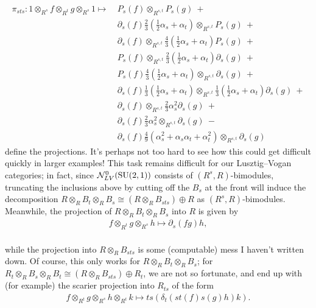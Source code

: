 \begin{align*}
\pi_{sts} : 1 \otimes_{R^s} f \otimes_{R^t} g \otimes_{R^s} 1 \mapsto\ &P_s(f) \otimes_{R^{s,t}} P_s(g)\ +\\
&\partial_s(f)\frac{2}{3}\left(\frac{1}{2}\alpha_s + \alpha_t\right) \otimes_{R^{s,t}} P_s(g)\ +\\
&\partial_s(f) \otimes_{R^{s,t}} \frac{4}{3}\left(\frac{1}{2}\alpha_s + \alpha_t\right) P_s(g)\ +\\
&P_s(f) \otimes_{R^{s,t}} \frac{2}{3}\left(\frac{1}{2}\alpha_s + \alpha_t\right)\partial_s(g)\ +\\
&P_s(f) \frac{4}{3}\left(\frac{1}{2}\alpha_s + \alpha_t\right) \otimes_{R^{s,t}} \partial_s(g)\ +\\
&\partial_s(f)\frac{1}{3}\left(\frac{1}{2}\alpha_s + \alpha_t\right) \otimes_{R^{s,t}} \frac{1}{3}\left(\frac{1}{2}\alpha_s + \alpha_t\right)\partial_s(g)\ +\\
&\partial_s(f) \otimes_{R^{s,t}} \frac{2}{3}\alpha_s^2\partial_s(g)\ +\\
&\partial_s(f)\frac{2}{3}\alpha_s^2 \otimes_{R^{s,t}} \partial_s(g)\ -\\
&\partial_s(f)\frac{4}{9}(\alpha_s^2 + \alpha_s\alpha_t + \alpha_t^2) \otimes_{R^{s,t}} \partial_s(g)
\end{align*}
\noindent define the projections. It's perhaps not too hard to see how this could get difficult quickly in larger examples! This task remains difficult for our Lusztig--Vogan categories; in fact, since $\mathcal{N}_{LV}^0(\textup{SU}(2, 1))$ consists of $(R^s, R)$-bimodules, truncating the inclusions above by cutting off the $B_s$ at the front will induce the decomposition $R \otimes_R B_t \otimes_R B_s \cong (R \otimes_R B_{sts}) \oplus R$ as $(R^s, R)$-bimodules. Meanwhile, the projection of $R \otimes_R B_t \otimes_R B_s$ into $R$ is given by\\[-\linespacing]
\begin{align*}
f \otimes_{R^t} g \otimes_{R^s} h \mapsto \partial_s(fg)h,
\end{align*}
\noindent\\[-\linespacing] while the projection into $R \otimes_R B_{sts}$ is some (computable) mess I haven't written down. Of course, this only works for $R \otimes_R B_t \otimes_R B_s$; for $R_t \otimes_R B_s \otimes_R B_t \cong (R \otimes_R B_{sts}) \oplus R_t$, we are not so fortunate, and end up with (for example) the scarier projection into $R_{ts}$ of the form\\[-\linespacing]
\begin{align*}
f \otimes_{R^t} g \otimes_{R^s} h \otimes_{R^t} k \mapsto ts(\delta_t(st(f)s(g)h)k).
\end{align*}
\newpage

